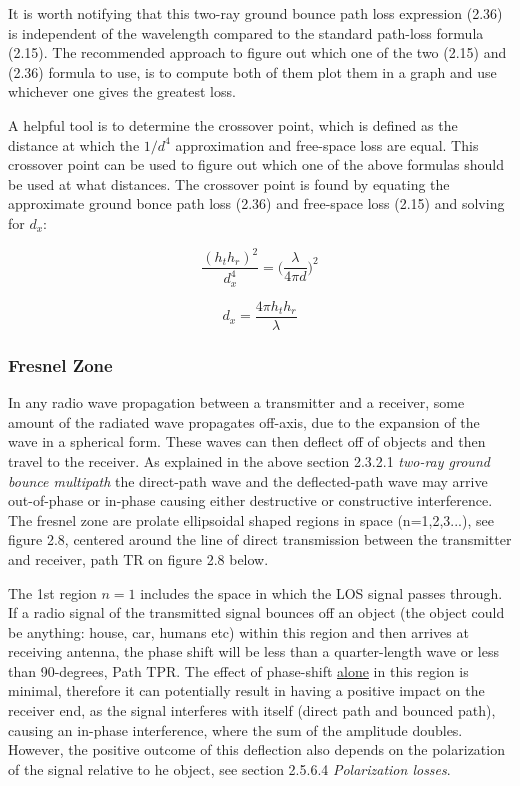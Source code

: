 It is worth notifying that this two-ray ground bounce path loss expression (2.36) is independent of the wavelength compared to the standard path-loss formula (2.15). The recommended approach to figure out which one of the two (2.15) and (2.36) formula to use, is to compute both of them plot them in a graph and use whichever one gives the greatest loss. 

A helpful tool is to determine the crossover point, which is defined as the distance at which the $1/d^4$ approximation and free-space loss are equal. This crossover point can be used to figure out which one of the above formulas should be used at what distances. The crossover point is found by equating the approximate ground bonce path loss (2.36) and free-space loss (2.15) and solving for $d_x$:

$$\frac{(h_th_r)^2}{d_x^4}=\Big(\frac{\lambda}{4 \pi d}\Big)^2$$

\begin{equation}
  d_x= \frac{4\pi h_th_r}{\lambda}
\end{equation}

\subsubsection{Fresnel Zone}
In any radio wave propagation between a transmitter and a receiver, some amount of the radiated wave propagates off-axis, due to the expansion of the wave in a spherical form. These waves can then deflect off of objects and then travel to the receiver. As explained in the above section 2.3.2.1 \textit{two-ray ground bounce multipath} the direct-path wave and the deflected-path wave may arrive out-of-phase or in-phase causing either destructive or constructive interference. The fresnel zone are prolate ellipsoidal\cite{ProlateEllipsoidal} shaped regions in space (n=1,2,3...), see figure 2.8, centered around the line of direct transmission between the transmitter and receiver, path TR on figure 2.8 below. 

The 1st region $n=1$ includes the space in which the LOS signal passes through. If a radio signal of the transmitted signal bounces off an object (the object could be anything: house, car, humans etc) within this region and then arrives at receiving antenna, the phase shift will be less than a quarter-length wave or less than 90-degrees, Path TPR. The effect of phase-shift \underline{alone} in this region is minimal, therefore it can potentially result in having a positive impact on the receiver end, as the signal interferes with itself (direct path and bounced path), causing an in-phase interference, where the sum of the amplitude doubles. However, the positive outcome of this deflection also depends on the polarization of the signal relative to he object, see section 2.5.6.4 \textit{Polarization losses}.

